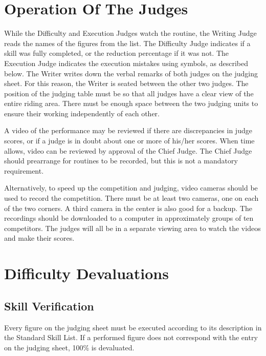 \section{Operation Of The Judges}
While the Difficulty and Execution Judges watch the routine, the Writing Judge reads the names of the figures from the list.
The Difficulty Judge indicates if a skill was fully completed, or the reduction percentage if it was not.
The Execution Judge indicates the execution mistakes using symbols, as described below.
The Writer writes down the verbal remarks of both judges on the judging sheet.
For this reason, the Writer is seated between the other two judges.
The position of the judging table must be so that all judges have a clear view of the entire riding area.
There must be enough space between the two judging units to ensure their working independently of each other.

A video of the performance may be reviewed if there are discrepancies in judge scores, or if a judge is in doubt about one or more of his/her scores.
When time allows, video can be reviewed by approval of the Chief Judge.
The Chief Judge should prearrange for routines to be recorded, but this is not a mandatory requirement.

Alternatively, to speed up the competition and judging, video cameras should be used to record the competition.
There must be at least two cameras, one on each of the two corners.
A third camera in the center is also good for a backup.
The recordings should be downloaded to a computer in approximately groups of ten competitors.
The judges will all be in a separate viewing area to watch the videos and make their scores.

\section{Difficulty Devaluations}

\subsection{Skill Verification}
Every figure on the judging sheet must be executed according to its description in the Standard Skill List.
If a performed figure does not correspond with the entry on the judging sheet, 100\% is devaluated.

